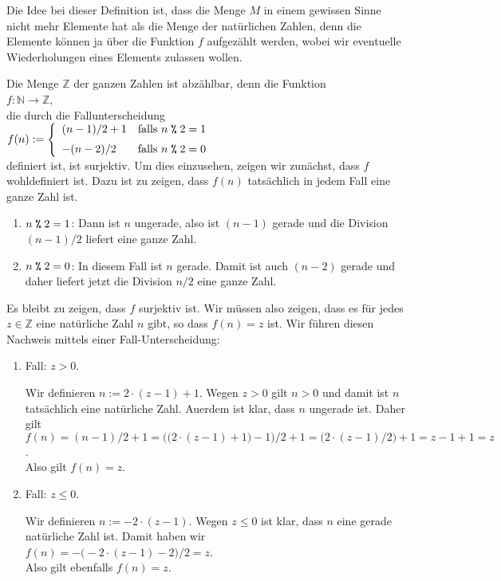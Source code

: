 Die Idee bei dieser Definition ist, dass die Menge  $M$ in einem gewissen Sinne nicht mehr Elemente hat
als die Menge der nat\"{u}rlichen Zahlen, denn die Elemente k\"{o}nnen ja \"{u}ber die Funktion $f$
aufgez\"{a}hlt werden, wobei wir eventuelle Wiederholungen eines Elements zulassen wollen.

\example
Die Menge $\mathbb{Z}$ der ganzen Zahlen ist abz\"{a}hlbar, denn die Funktion
\\[0.2cm]
\hspace*{1.3cm}
$f: \mathbb{N} \rightarrow \mathbb{Z}$,
\\[0.2cm]
die durch die Fallunterscheidung
\\[0.2cm]
\hspace*{1.3cm}
$f(n) := \left\{ \begin{array}[c]{ll}
                 (n - 1) / 2 + 1  & \mbox{falls $n \;\texttt{\%}\; 2 = 1$}  \\[0.2cm]
                 - (n - 2) / 2          & \mbox{falls $n \;\texttt{\%}\; 2 = 0$}
                 \end{array}
         \right.
$ 
\\[0.2cm]
definiert ist, ist surjektiv.  Um dies einzusehen, zeigen wir zun\"{a}chst, dass $f$ wohldefiniert ist.
Dazu ist zu zeigen, dass $f(n)$ tats\"{a}chlich in jedem Fall eine ganze Zahl ist.
\begin{enumerate}
\item $n \;\texttt{\%}\; 2 = 1$:  Dann ist $n$ ungerade, also ist $(n-1)$ gerade und die Division
      $(n-1)/2$ liefert eine ganze Zahl.
\item $n \;\texttt{\%}\; 2 = 0$:  In diesem Fall ist $n$ gerade.  Damit ist auch $(n-2)$ gerade und daher
      liefert jetzt die Division $n/2$ eine ganze Zahl.
\end{enumerate}
Es bleibt zu zeigen, dass $f$ surjektiv ist.  Wir m\"{u}ssen also zeigen, dass es f\"{u}r jedes 
$z \in \mathbb{Z}$ eine nat\"{u}rliche Zahl $n$ gibt, so dass $f(n) = z$ ist.  Wir f\"{u}hren diesen Nachweis
mittels einer Fall-Unterscheidung:
\begin{enumerate}
\item Fall: $z > 0$.
  
      Wir definieren $n := 2 \cdot (z - 1) + 1$.  Wegen $z >0$ gilt $n > 0$ und damit ist $n$
      tats\"{a}chlich eine nat\"{u}rliche Zahl.  Au\3erdem ist klar, dass $n$ ungerade ist. Daher gilt
      \\[0.2cm]
      \hspace*{0.3cm}
      $f(n) = (n - 1)/2 + 1 = \bigl(\bigl(2 \cdot (z - 1) + 1\bigr) - 1\bigr)/2 + 1 
            = \bigl(2 \cdot (z - 1)/2\bigr) + 1= z-1 + 1 = z
      $.
      \\[0.2cm]
      Also gilt $f(n) = z$.
\item Fall: $z \leq 0$.

      Wir definieren $n := - 2 \cdot (z - 1)$.  Wegen $z \leq 0$ ist klar, dass $n$ eine gerade 
      nat\"{u}rliche Zahl ist.  Damit haben wir
      \\[0.2cm]
      \hspace*{1.3cm}
      $f(n) = -\bigl(-2 \cdot (z - 1) - 2\bigr)/2 = z$.
      \\[0.2cm]
      Also gilt ebenfalls $f(n) = z$.
\end{enumerate}
